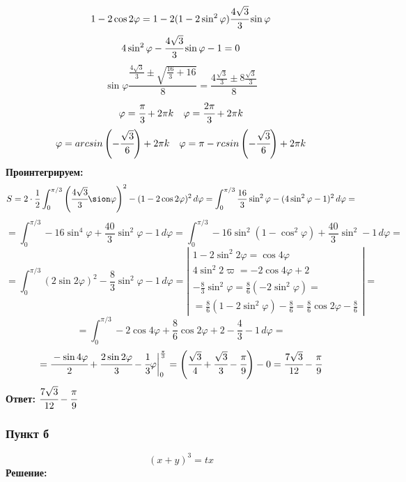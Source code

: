 $$1 - 2 \cos 2\varphi = 1-2(1-2\sin^2 \varphi)\cfrac{4 \sqrt{3}}{3} \sin \varphi$$
$$4\sin^2 \varphi - \cfrac{4 \sqrt{3}}{3} \sin \varphi -1 = 0$$
$$\sin \varphi \frac{\frac{4\sqrt{3}}{3} \pm \sqrt{\frac{16}{3} + 16}}{8} =  \frac{4 \frac{\sqrt{3}}{3} \pm 8 \frac{\sqrt{3}}{3}}{8}$$
$$\varphi = \cfrac{\pi}{3} + 2\pi k \quad \varphi = \cfrac{2\pi}{3} + 2\pi k$$
$$\varphi = arcsin \left( - \cfrac{\sqrt{3}}{6}\right) + 2\pi k \quad \varphi = \pi - rcsin \left( - \cfrac{\sqrt{3}}{6}\right) + 2\pi k$$
\textbf{Проинтегрируем:}
$$S = 2 \cdot \frac{1}{2} \int_0^{\pi/3}\left( \cfrac{4 \sqrt{3}}{3} \sion \varphi \right)^2 - (1-2\cos 2\varphi)^2 \, d \varphi = \int_0^{\pi/3} \frac{16}{3} \sin^2 \varphi - (4 \sin^2 \varphi -1)^2 \, d \varphi =$$
$$ = \int_0^{\pi/3} -16 \sin^4 \varphi + \frac{40}{3} \sin^2 \varphi -1 \, d \varphi =  \int_0^{\pi/3} -16 \sin^2(1 - \cos ^2 \varphi) + \frac{40}{3} \sin^2 - 1 \, d \varphi =$$
$$=  \int_0^{\pi/3} (2 \sin 2\varphi)^2 - \frac{8}{3} \sin^2 \varphi -1 \, d \varphi = \left |
\begin{array}{c}
     1-2\sin^2 2\varphi = \cos 4 \varphi\\
     4 \sin^2 2\varpi = -2 \cos 4 \varphi + 2 \\
     -\frac{8}{3} \sin^2 \varphi = \frac{8}{6} (-2 \sin^2 \varphi) = \\ = \frac{8}{6}(1 - 2 \sin^2 \varphi) - \frac{8}{6}  =\frac{8}{6} \cos 2 \varphi - \frac{8}{6}
\end{array} 
\right| =
$$
$$
 =\int_0^{\pi/3}-2\cos 4 \varphi + \frac{8}{6} \cos 2 \varphi + 2 - \frac{4}{3} - 1 \, d \varphi = 
$$
$$
= \cfrac{- \sin 4 \varphi}{2} + \cfrac{2 \sin 2 \varphi}{3} - \cfrac{1}{3}\varphi \biggr | ^{\frac{\pi}{3}}_0 = \left( \cfrac{\sqrt{3}}{4} + \cfrac{\sqrt{3}}{3} - \cfrac{\pi}{9} \right) - 0 = \cfrac{7 \sqrt{3}}{12} - \cfrac{\pi}{9}
$$
\textbf{Ответ:} $\cfrac{7 \sqrt{3}}{12} - \cfrac{\pi}{9}$

\subsubsection*{Пункт б}
$$(x+y)^3=tx$$
\textbf{Решение:}


